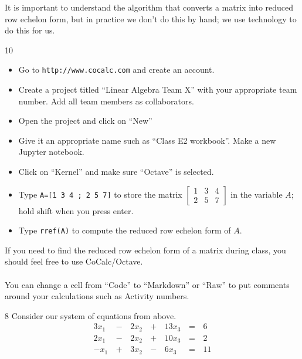 \begin{applicationActivities}
\begin{remark}
It is important to understand the  algorithm that converts a matrix into reduced row echelon form, but in practice we don't do this by hand; we use technology to do this for us.
\end{remark}

\begin{activity}{10}
\begin{itemize}
\item Go to {\tt http://www.cocalc.com} and create an account.
\item Create a project titled ``Linear Algebra Team X'' with your appropriate team number.  Add all team members as collaborators.
\item Open the project and click on ``New''
\item Give it an appropriate name such as ``Class E2 workbook''.  Make a new Jupyter notebook.
\item Click on ``Kernel'' and make sure ``Octave'' is selected.
\item Type {\tt A=[1 3 4 ; 2 5 7]} to store the matrix $\begin{bmatrix} 1 & 3 & 4 \\ 2 & 5 & 7\end{bmatrix}$ in the variable $A$; hold shift when you press enter.
\item Type {\tt rref(A)} to compute the reduced row echelon form of $A$.
\end{itemize}
\end{activity}

\begin{remark}
If you need to find the reduced row echelon form of a matrix during class, you should feel free to use CoCalc/Octave.
\ \\
\ \\
You can change a cell from ``Code'' to ``Markdown'' or ``Raw'' to put comments around your calculations such as Activity numbers.
\end{remark}

\begin{activity}{8}
Consider our system of equations from above.
 \[
		\begin{alignedat}{4}
   		  3x_1 &\,-\,& 2x_2 &\,+\,& 13x_3 &\,=\,& 6 \\
   		  2x_1 &\,-\,& 2x_2 &\,+\,& 10x_3 &\,=\,& 2 \\
   		  -x_1 &\,+\,& 3x_2 &\,-\,&  6x_3 &\,=\,& 11
   		\end{alignedat}
\]


\end{activity}
\end{applicationActivities}
